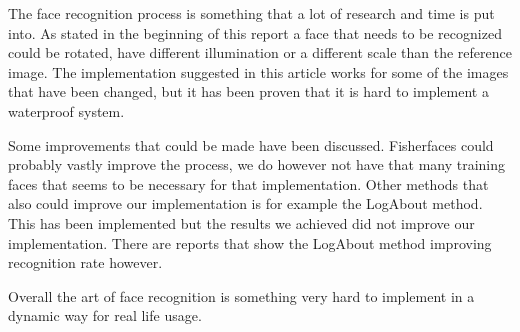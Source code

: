 The face recognition process is something that a lot of research and time is put into. As stated in the beginning of this report a face that needs to be recognized could be rotated, have different illumination or a different scale than the reference image. The implementation suggested in this article works for some of the images that have been changed, but it has been proven that it is hard to implement a waterproof system. 

Some improvements that could be made have been discussed. Fisherfaces could probably vastly improve the process, we do however not have that many training faces that seems to be necessary for that implementation. Other methods that also could improve our implementation is for example the LogAbout method. This has been implemented but the results we achieved did not improve our implementation. There are reports that show the LogAbout method improving recognition rate however.

Overall the art of face recognition is something very hard to implement in a dynamic way for real life usage. 
